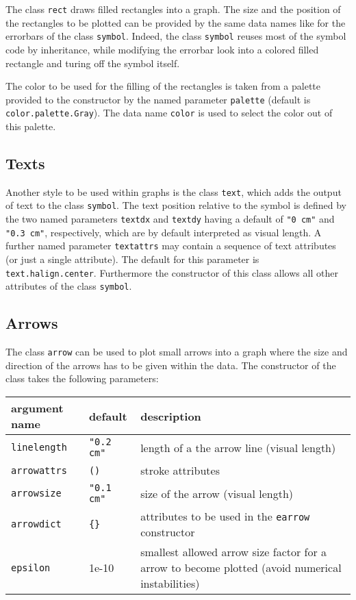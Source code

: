 The class \verb|rect| draws filled rectangles into a graph. The size
and the position of the rectangles to be plotted can be provided by
the same data names like for the errorbars of the class \verb|symbol|.
Indeed, the class \verb|symbol| reuses most of the symbol code by
inheritance, while modifying the errorbar look into a colored filled
rectangle and turing off the symbol itself.

The color to be used for the filling of the rectangles is taken from a
palette provided to the constructor by the named parameter
\verb|palette| (default is \verb|color.palette.Gray|). The data
name \verb|color| is used to select the color out of this palette.

\subsection{Texts}

Another style to be used within graphs is the class \verb|text|, which
adds the output of text to the class \verb|symbol|. The text
position relative to the symbol is defined by the two named
parameters \verb|textdx| and \verb|textdy| having a default of
\verb|"0 cm"| and \verb|"0.3 cm"|, respectively, which are by default
interpreted as visual length. A further named parameter
\verb|textattrs| may contain a sequence of text attributes (or just a
single attribute). The default for this parameter is
\verb|text.halign.center|. Furthermore the constructor of this class
allows all other attributes of the class \verb|symbol|.

\subsection{Arrows}

The class \verb|arrow| can be used to plot small arrows into a graph
where the size and direction of the arrows has to be given within the
data. The constructor of the class takes the following parameters:

\medskip
\begin{tabularx}{\linewidth}{ll>{\raggedright\arraybackslash}X}
argument name&default&description\\
\hline
\texttt{linelength}&\texttt{"0.2 cm"}&length of a the arrow line (visual length)\\
\texttt{arrowattrs}&\texttt{()}&stroke attributes\\
\texttt{arrowsize}&\texttt{"0.1 cm"}&size of the arrow (visual length)\\
\texttt{arrowdict}&\texttt{\{\}}&attributes to be used in the \texttt{earrow} constructor\\
\texttt{epsilon}&1e-10&smallest allowed arrow size factor for a arrow to become plotted (avoid numerical instabilities)\\
\end{tabularx}
\medskip

